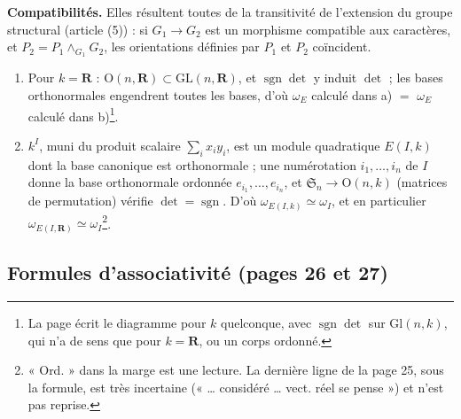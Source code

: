 \documentclass[11pt,a4paper]{article}
\begin{document}
\textbf{Compatibilités.} Elles résultent toutes de la transitivité de
l'extension du groupe structural (article (5)) : si $G_1 \to G_2$ est un
morphisme compatible aux caractères, et $P_2 = P_1 \wedge_{G_1} G_2$, les
orientations définies par $P_1$ et $P_2$ coïncident.
\begin{enumerate}
\item[a)--b)] Pour $k = \mathbf{R}$ : $\mathrm{O}(n, \mathbf{R}) \subset
\mathrm{GL}(n, \mathbf{R})$, et $\operatorname{sgn}\det$ y induit $\det$ ; les
bases orthonormales engendrent toutes les bases, d'où $\omega_E$ calculé dans
a) $=$ $\omega_E$ calculé dans b)\footnote{La page écrit le diagramme pour
$k$ quelconque, avec $\operatorname{sgn} \det$ sur $\mathrm{Gl}(n, k)$, qui n'a
de sens que pour $k = \mathbf{R}$, ou un corps ordonné.}.
\item[b)--c)] $k^I$, muni du produit scalaire $\sum_{i} x_i y_i$, est un module
quadratique $E(I, k)$ dont la base canonique est orthonormale ; une
numérotation $i_1, \ldots, i_n$ de $I$ donne la base orthonormale ordonnée
$e_{i_1}, \ldots, e_{i_n}$, et $\mathfrak{S}_n \to \mathrm{O}(n, k)$ (matrices
de permutation) vérifie $\det = \operatorname{sgn}$. D'où $\omega_{E(I, k)}
\simeq \omega_I$, et en particulier $\omega_{E(I, \mathbf{R})} \simeq
\omega_I$\footnote{« Ord. » dans la marge est une lecture. La dernière ligne
de la page 25, sous la formule, est très incertaine (« \ldots{} considéré
\ldots{} vect. réel se pense ») et n'est pas reprise.}.
\end{enumerate}

\subsection*{Formules d'associativité (pages 26 et 27)}
\end{document}
